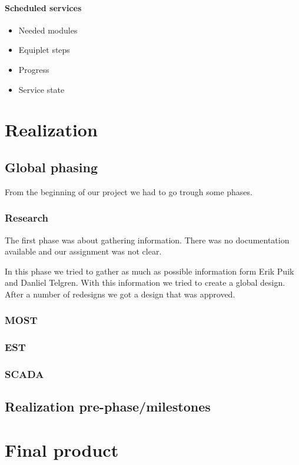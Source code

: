 \documentclass[12pt,a4paper]{report}
\begin{document}
\subsubsection{Scheduled services}
\begin{itemize}
\item Needed modules
\item Equiplet steps
\item Progress
\item Service state
\end{itemize}

\chapter{Realization}
\section{Global phasing}
From the beginning of our project we had to go trough some phases.

\subsection{Research}
The first phase was about gathering information.
There was no documentation available and our assignment was not clear.

In this phase we tried to gather as much as possible information form Erik Puik and Danliel Telgren.
With this information we tried to create a global design.
After a number of redesigns we got a design that was approved.

\subsection{MOST}


\subsection{EST}

\subsection{SCADA}

\newpage
\section{Realization pre-phase/milestones}

\chapter{Final product}
\end{document}
